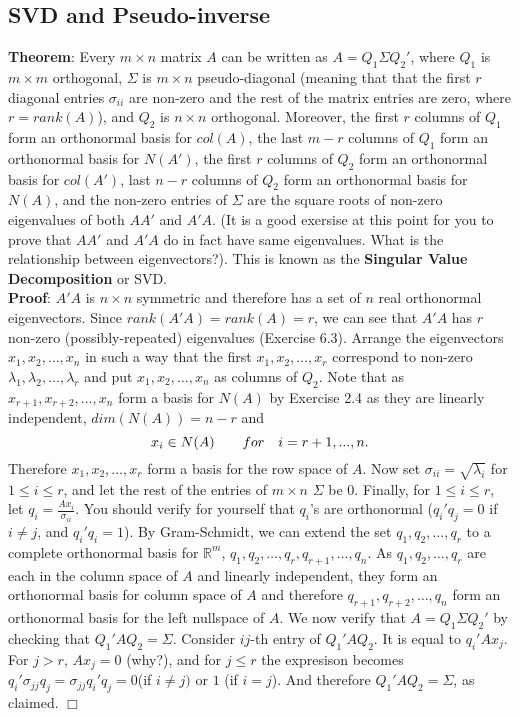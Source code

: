 \documentclass[12pt,oneside]{article}
\begin{document}
\subsection{SVD and Pseudo-inverse}
\textbf{Theorem}: Every $m \times n$  matrix $A$ can be written as $A
= Q_1 \Sigma Q_2'$, where $Q_1$ is $m \times m$ orthogonal, $\Sigma$ is
$m \times n$ pseudo-diagonal (meaning that that the first $r$
diagonal entries $\sigma_{ii}$ are non-zero and the rest of the matrix
entries are zero, where $r = rank(A)$), and $Q_2$ is $n \times n$
orthogonal. Moreover, the first $r$ columns of $Q_1$ form an
orthonormal basis for $col(A)$, the last $m-r$ columns of $Q_1$ form
an orthonormal basis for $N(A')$, the first $r$ columns of $Q_2$ form
an orthonormal basis for $col(A')$, last $n-r$ columns of $Q_2$ form
an orthonormal basis for $N(A)$, and the non-zero entries of $\Sigma$
are the square roots of non-zero eigenvalues of both $AA'$ and
$A'A$. (It is a good exersise at this point for you to prove that
$AA'$ and $A'A$ do in fact have same eigenvalues. What is the
relationship between eigenvectors?). This is known as the \textbf{Singular
  Value Decomposition} or SVD.\\

\noindent \textbf{Proof}: $A'A$ is $n \times n$ symmetric and therefore has a
set of $n$ real orthonormal eigenvectors. Since $rank(A'A) = rank(A) =
r$, we can see that $A'A$ has $r$ non-zero (possibly-repeated)
eigenvalues (Exercise 6.3). Arrange the eigenvectors $x_1, x_2, \ldots, x_n$
in such a way that the first $x_1, x_2, \ldots, x_r$ correspond to
non-zero $\lambda_1, \lambda_2, \ldots, \lambda_r$ and put $x_1, x_2,
\ldots, x_n$ as columns of $Q_2$.  Note that as $x_{r+1}, x_{r + 2}, \ldots, x_n$ form a basis for $N(A)$ by Exercise 2.4 as they are linearly independent, $dim(N(A)) = n- r$ and \[x_i \in N(A) \hspace{10 pt} \hspace{10 pt} for \hspace{10 pt} i=r+1,...,n. \]
Therefore $x_1, x_2, \ldots, x_r$ form a basis for the row
space of $A$. Now set $\sigma_{ii} = \sqrt{\lambda_i}$ for $1 \leq i
\leq r$, and let the rest of the entries of $m \times n$ $\Sigma$ be
0. Finally, for $1 \leq i \leq r$, let $q_i =
\frac{Ax_i}{\sigma_{ii}}$. You should verify for yourself that $q_i$'s
are orthonormal ($q_i ' q_j = 0$ if $i \neq j$, and $q_i' q_i =
1$). By Gram-Schmidt, we can extend the set $q_1, q_2, \ldots, q_r$ to
a complete orthonormal basis for $\mathbb{R}^m$, $q_1, q_2, \ldots,
q_r, q_{r+1}, \ldots, q_n$. As $q_1, q_2, \ldots, q_r$ are each in the column space of $A$ and linearly independent, they form an orthonormal basis for column space of $A$ and therefore $q_{r+1}, q_{r+2}, \ldots, q_n$ form an orthonormal
basis for the left nullspace of $A$. We now verify that $A = Q_1 \Sigma
Q_2 '$ by checking that $Q_1' A Q_2 = \Sigma$. Consider $ij$-th entry
of $Q_1 ' A Q_2$. It is equal to $q_i ' Ax_j$. For $j > r$,
$Ax_j = 0$ (why?), and for $j \leq r$ the expresison becomes $q_i '
\sigma_{jj} q_j = \sigma_{jj} q_i ' q_j = 0$(if $i \neq j)$ or $1$ (if
$i = j$). And therefore $Q_1 ' A Q_2 = \Sigma$, as claimed. $\Box$\\
\end{document}
